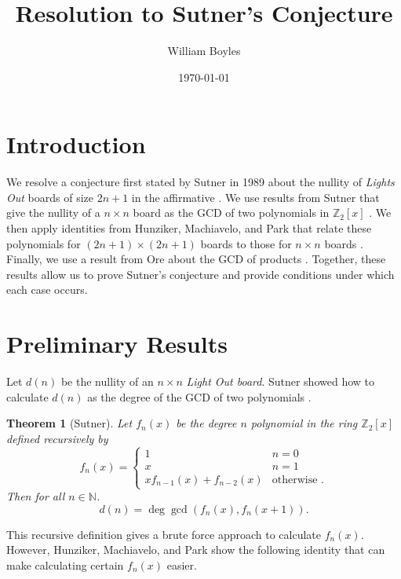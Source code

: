 \documentclass[a4paper]{article}
\newtheorem{theorem}{Theorem}
\newcommand{\Z}{\mathbb{Z}}
\newcommand{\N}{\mathbb{N}}
\begin{document}
	\title{Resolution to Sutner's Conjecture}
	\author{William Boyles}
	\date{\today}
	\maketitle
	
	\section{Introduction}
	We resolve a conjecture first stated by Sutner in 1989 about the nullity of \textit{Lights Out} boards of size $2n + 1$ in the affirmative \cite{Sutner1989}.
	We use results from Sutner that give the nullity of a $n \times n$ board as the GCD of two polynomials in $\Z_2[x]$ \cite{Sutner96sigma-automataand}.
	We then apply identities from Hunziker, Machiavelo, and Park that relate these polynomials for $(2n+1) \times (2n+1)$ boards to those for $n \times n$ boards \cite{HUNZIKER2004465}.
	Finally, we use a result from Ore about the GCD of products \cite{ore_number_theory}.
	Together, these results allow us to prove Sutner's conjecture and provide conditions under which each case occurs.
	
	\section{Preliminary Results}
	Let $d(n)$ be the nullity of an $n \times n$ \textit{Light Out board}.
	Sutner showed how to calculate $d(n)$ as the degree of the GCD of two polynomials \cite{Sutner96sigma-automataand}.
	
	\begin{theorem}[Sutner]\label{Sutner_gcd}
		Let $f_n(x)$ be the degree $n$ polynomial in the ring $\Z_2[x]$ defined recursively by
		\begin{equation*}
			f_n(x) = \begin{cases}
				1 & n=0 \\
				x & n=1 \\
				xf_{n-1}(x) + f_{n-2}(x) & \text{otherwise }.
			\end{cases}
		\end{equation*}
		Then for all $n \in \N$.
		\begin{equation*}
			d(n) = \deg{\gcd\left(f_{n}(x), f_{n}(x+1)\right)}.
		\end{equation*}
	\end{theorem}

	This recursive definition gives a brute force approach to calculate $f_n(x)$.
	However, Hunziker, Machiavelo, and Park show the following identity that can make calculating certain $f_n(x)$ easier.
	
\end{document}
